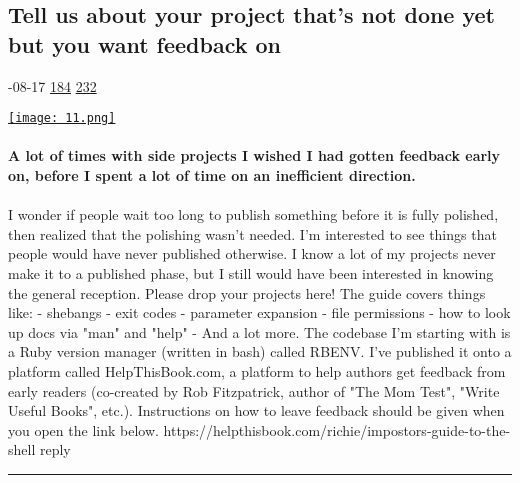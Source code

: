 \documentclass[10pt,a4paper]{article}
\begin{document}
\begin{multicols*}{2}

\noindent\begin{minipage}{\linewidth}
\subsection{Tell us about your project that's not done yet but you want feedback on}
\textsc{\footnotesize
{\scriptsize\faCalendar}-08-17 
{\scriptsize\faThumbsOUp}\space 
\href{http://news.ycombinator.com/item?id=37138807\&utm\_term=comment}{184} 
{\scriptsize\faComments}\space 
\href{http://news.ycombinator.com/item?id=37138807\&utm\_term=comment}{232} 
}
\par\medskip\noindent
\href{https://news.ycombinator.com/item?id=37156101\&utm\_source=hackernewsletter\&utm\_medium=email\&utm\_term=ask\_hn}{
    \texttt{[image: 11.png]}
}
\end{minipage}
\paragraph{}
\textbf{A lot of times with side projects I wished I had gotten feedback early on, before I spent a lot of time on an inefficient direction.}
\paragraph{}
 I wonder if people wait too long to publish something before it is fully polished, then realized that the polishing wasn't needed.
I'm interested to see things that people would have never published otherwise. I know a lot of my projects never make it to a published phase, but I still would have been interested in knowing the general reception. Please drop your projects here!
The guide covers things like:
- shebangs
- exit codes
- parameter expansion
- file permissions
- how to look up docs via "man" and "help"
- And a lot more.
The codebase I'm starting with is a Ruby version manager (written in bash) called RBENV. I've published it onto a platform called HelpThisBook.com, a platform to help authors get feedback from early readers (co-created by Rob Fitzpatrick, author of "The Mom Test", "Write Useful Books", etc.). Instructions on how to leave feedback should be given when you open the link below.
https://helpthisbook.com/richie/impostors-guide-to-the-shell
reply
\par\noindent\textcolor{red}{\rule{\linewidth}{0.2mm}}
\vfill
\null
\noindent\begin{minipage}{\linewidth}

\end{minipage}
\end{multicols*}
\end{document}
